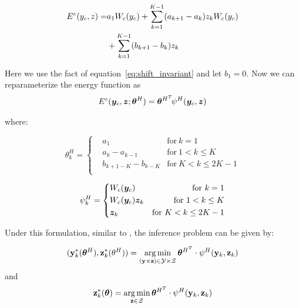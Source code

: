 \begin{align}
  \label{eq:originalenergy}
  E^c(y_c,z)
  =&a_1W_c(y_c)+\sum_{k=1}^{K-1}(a_{k+1}-a_k)z_kW_c(y_c) \notag \\
   &+\sum_{k=1}^{K-1}(b_{k+1}-b_k)z_k
\end{align}

Here we use the fact of equation~\eqref{eq:shift_invariant} and
let $b_1=0$. Now we can reparameterize the energy function
as
\begin{align}
  \label{eq:llsvm_innerprod_energy}
  E^c({\bm{y}}_c,{\bm{z}}; {\bm{\theta}}^H) = {\bm{\theta}}^{H^T} \! \psi^H({\bm{y}}_c,{\bm{z}})
\end{align}

\noindent where:

\begin{equation}
\label{eq:llsvm_param}
  \theta_k^H = \left\{
    \begin{aligned}
      & a_1	& \text{for} \ k=1\\
      & a_k-a_{k-1} & \text{for}\ 1< k \leq K\\
      & b_{k+1-K}-b_{k-K} & \text{for} \ K<k\le2K-1\\
    \end{aligned}
  \right.
\end{equation}

\begin{equation}
\label{eq:llsvm_feature}
  \psi_k^H = \left\{
		\begin{aligned}
      & W_c({\bm{y}}_c) 	& \text{for} \ k=1\\
      & W_c({\bm{y}}_c){\bm{z}}_k & \text{for}\ 1<k\le K\\
      & {\bm{z}}_k & \text{for} \ K<k\le2K-1\\
		\end{aligned}
  \right.
\end{equation}

Under this formulation, similar to \cite{yu2009learning}, the inference problem
can be given by:

\begin{align}
  \label{eq:linenv_full_inf}
  (\mathbf{y}^*_k({\bm{\theta}}^H),\mathbf{z}^*_k(\theta^H))=\operatorname*{arg\,min}_{(\mathbf{y}
  \times \mathbf{z}) \in \mathcal{Y} \times \mathcal{Z}}
  {\bm{\theta}}^{H^T}\cdot\psi^H(\mathbf{y}_k,\mathbf{z}_k)
\end{align}
and
\begin{align}
  \label{eq:linenv_latent_inf}
  \mathbf{z}^*_k({\bm{\theta}}) = \operatorname*{arg\,min}_{\mathbf{z} \in \mathcal{Z}}
  {\bm{\theta}}^{H^T} \cdot \psi^H(\mathbf{y}_k,\mathbf{z}_k)
\end{align}

